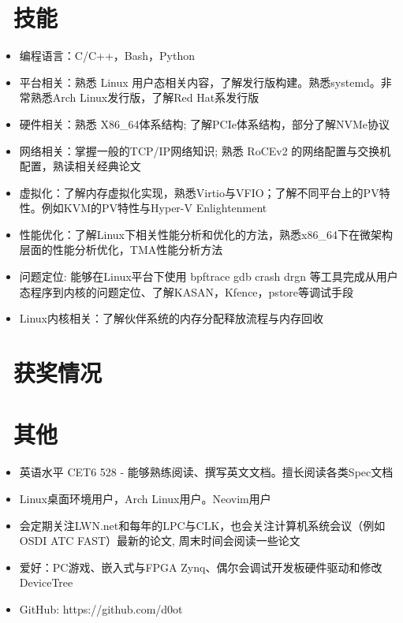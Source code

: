 \documentclass{resume}
\begin{document}
\section{\faCogs\ 技能}
\begin{itemize}[parsep=0.5ex]
  \item 编程语言：C/C++，Bash，Python
  \item 平台相关：熟悉 Linux 用户态相关内容，了解发行版构建。熟悉systemd。非常熟悉Arch Linux发行版，了解Red Hat系发行版
  \item 硬件相关：熟悉 X86\_64体系结构; 了解PCIe体系结构，部分了解NVMe协议
  \item 网络相关：掌握一般的TCP/IP网络知识; 熟悉 RoCEv2 的网络配置与交换机配置，熟读相关经典论文
  \item 虚拟化：了解内存虚拟化实现，熟悉Virtio与VFIO；了解不同平台上的PV特性。例如KVM的PV特性与Hyper-V Enlightenment
  \item 性能优化：了解Linux下相关性能分析和优化的方法，熟悉x86\_64下在微架构层面的性能分析优化，TMA性能分析方法
  \item 问题定位: 能够在Linux平台下使用 bpftrace gdb crash drgn 等工具完成从用户态程序到内核的问题定位、了解KASAN，Kfence，pstore等调试手段
  \item Linux内核相关：了解伙伴系统的内存分配释放流程与内存回收
\end{itemize}


\section{\faHeartO\ 获奖情况}


\section{\faInfo\ 其他}
\begin{itemize}[parsep=0.5ex]
  \item 英语水平 CET6 528 - 能够熟练阅读、撰写英文文档。擅长阅读各类Spec文档
  \item Linux桌面环境用户，Arch Linux用户。Neovim用户
  \item 会定期关注LWN.net和每年的LPC与CLK，也会关注计算机系统会议（例如OSDI ATC FAST）最新的论文, 周末时间会阅读一些论文
  \item 爱好：PC游戏、嵌入式与FPGA Zynq、偶尔会调试开发板硬件驱动和修改DeviceTree
  \item GitHub: https://github.com/d0ot

\end{itemize}

%
%
\end{document}
